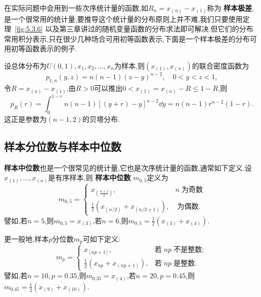 在实际问题中会用到一些次序统计量的函数,如$R_n=x_{(n)}-x_{(1)}$称为 \textbf{样本极差},是一个很常用的统计量,要推导这个统计量的分布原则上并不难,我们只要使用定理~\ref{fig:5.3.6} 以及第三章讲过的随机变量函数的分布求法即可解决.但它们的分布常用积分表示,只在很少几种场合可用初等函数表示,下面是一个样本极差的分布可用初等函数表示的例子.
\begin{example}\label{exam:5.3.9}
设总体分布为$U(0,1),x_1,x_2,\dotsc,x_n$为样本,则$(x_{(1)},x_{(n)})$的联合密度函数为
\[p_{1,n}(y,z)=n(n-1)(z-y)^{n-2},\quad 0<y<z<1,\]
令$R=x_{(n)}-x_{(1)}$,由$R>0$可以推出$0<x_{(1)}=x_{(n)}-R\leq1-R$,则
\[p_R(r)=\int_0^{1-r}n(n-1)[(y+r)-y]^{n-2}\dd y=n(n-1)r^{n-2}(1-r).\]
这正是参数为$(n-1,2)$的贝塔分布.
\end{example}
\subsection{样本分位数与样本中位数}
 \textbf{样本中位数}也是一个很常见的统计量,它也是次序统计量的函数,通常如下定义.设$x_{(1)},\dotsc,x_{(n)}$是有序样本,则 \textbf{样本中位数} $m_{0,5}$定义为
\[m_{0,5}=\begin{cases}
x_{\left(\frac{n+1}2\right)},&n\;\text{为奇数}\\
\frac12\left(x_{(n/2)}+x_{(n/2+1)}\right),&\;\text{为偶数}.
\end{cases}\]
譬如,若$n=5$,则$m_{0,5}=x_{(3)}$,若$n=6$,则$m_{0,5}=\frac12(x_{(3)}+x_{(4)})$.

更一般地,样本$p$分位数$m_p$可如下定义:
\[m_p=\begin{cases}
x_{[np+1]},&\text{若}\;np\;\text{不是整数};\\
\frac12\left(x_{np}+x_{(np+1)}\right),&\text{若}\;np\;\text{是整数}.
\end{cases}\]
譬如,若$n=10,p=0.35$,则$m_{0.35}=x_{(4)}$,若$n=20,p=0.45$,则$m_{0.45}=\frac12(x_{(9)}+x_{(10)})$.

